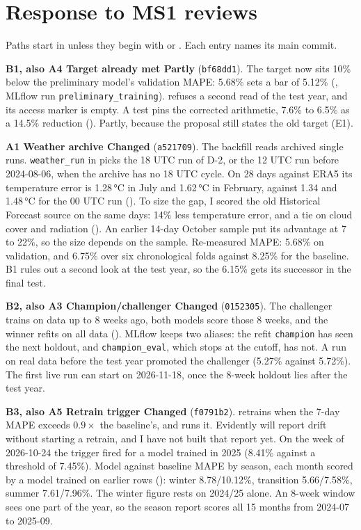 \documentclass[10pt,a4paper]{article}
\newcommand{\point}[4]{\textbf{#1 \textperiodcentered{} #2 \textperiodcentered{} #3}\if\relax\detokenize{#4}\relax\else{} (\texttt{#4})\fi.}
\begin{document}
\section{Response to MS1 reviews}
Paths start in  unless they begin with  or . Each entry names its main commit.

\point{B1, also A4}{Target already met}{Partly}{bf68dd1}
The target now sits 10\% below the preliminary model's validation MAPE: 5.68\% sets a bar of 5.12\%
(, MLflow run \texttt{preliminary\_training}). 
refuses a second read of the test year, and its access marker is empty. A test pins the corrected arithmetic, 7.6\% to
6.5\% as a 14.5\% reduction (). Partly, because the proposal still states the old
target (E1).

\point{A1}{Weather archive}{Changed}{a521709}
The backfill reads archived single runs. \texttt{weather\_run} in  picks the 18 UTC run of
D-2, or the 12 UTC run before 2024-08-06, when the archive has no 18 UTC cycle. On 28 days against ERA5 its temperature error
is 1.28\,°C in July and 1.62\,°C in February, against 1.34 and 1.48\,°C for the 00 UTC run
(). To size the gap, I scored the old Historical Forecast source on the same
days: 14\% less temperature error, and a tie on cloud cover and radiation ().
An earlier 14-day October sample put its advantage at 7 to 22\%, so the size depends on the sample. Re-measured MAPE: 5.68\% on
validation, and 6.75\% over six chronological folds against 8.25\% for the baseline. B1 rules out a second look at the test
year, so the 6.15\% gets its successor in the final test.

\point{B2, also A3}{Champion/challenger}{Changed}{0152305}
The challenger trains on data up to 8 weeks ago, both models score those 8 weeks, and the winner refits on all data
(). MLflow keeps two aliases: the refit \texttt{champion} has seen the next
holdout, and \texttt{champion\_eval}, which stops at the cutoff, has not. A run on real data before the test year promoted the
challenger (5.27\% against 5.72\%). The first live run can start on 2026-11-18, once the 8-week holdout lies after the test year.

\point{B3, also A5}{Retrain trigger}{Changed}{f0791b2}
 retrains when the 7-day MAPE exceeds $0.9\times$ the baseline's, and
 runs it. Evidently will report drift without starting a retrain, and I have
not built that report yet. On the week of 2026-10-24 the trigger fired for a model trained in 2025 (8.41\% against a threshold
of 7.45\%). Model against baseline MAPE by season, each month scored by a model trained on earlier rows
(): winter 8.78/10.12\%, transition 5.66/7.58\%, summer 7.61/7.96\%. The winter figure
rests on 2024/25 alone. An 8-week window sees one part of the year, so the season report scores all 15 months from 2024-07 to
2025-09.
\end{document}
